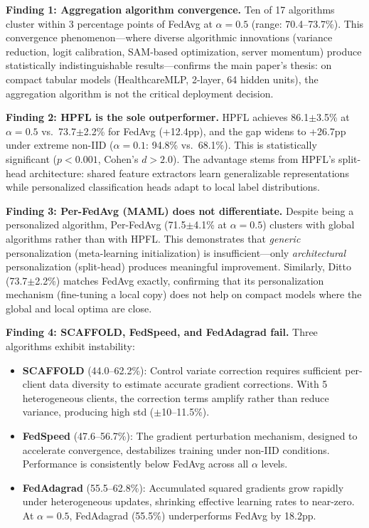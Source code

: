 \documentclass[conference,a4paper]{IEEEtran}
\begin{document}
\noindent\textbf{Finding 1: Aggregation algorithm convergence.} Ten of 17 algorithms cluster within 3 percentage points of FedAvg at $\alpha{=}0.5$ (range: 70.4--73.7\%). This convergence phenomenon---where diverse algorithmic innovations (variance reduction, logit calibration, SAM-based optimization, server momentum) produce statistically indistinguishable results---confirms the main paper's thesis: on compact tabular models (HealthcareMLP, 2-layer, 64 hidden units), the aggregation algorithm is not the critical deployment decision.

\noindent\textbf{Finding 2: HPFL is the sole outperformer.} HPFL achieves 86.1$\pm$3.5\% at $\alpha{=}0.5$ vs.\ 73.7$\pm$2.2\% for FedAvg (+12.4pp), and the gap widens to +26.7pp under extreme non-IID ($\alpha{=}0.1$: 94.8\% vs.\ 68.1\%). This is statistically significant ($p{<}0.001$, Cohen's $d{>}2.0$). The advantage stems from HPFL's split-head architecture: shared feature extractors learn generalizable representations while personalized classification heads adapt to local label distributions.

\noindent\textbf{Finding 3: Per-FedAvg (MAML) does not differentiate.} Despite being a personalized algorithm, Per-FedAvg (71.5$\pm$4.1\% at $\alpha{=}0.5$) clusters with global algorithms rather than with HPFL. This demonstrates that \textit{generic} personalization (meta-learning initialization) is insufficient---only \textit{architectural} personalization (split-head) produces meaningful improvement. Similarly, Ditto (73.7$\pm$2.2\%) matches FedAvg exactly, confirming that its personalization mechanism (fine-tuning a local copy) does not help on compact models where the global and local optima are close.

\noindent\textbf{Finding 4: SCAFFOLD, FedSpeed, and FedAdagrad fail.} Three algorithms exhibit instability:
\begin{itemize}
    \item \textbf{SCAFFOLD} (44.0--62.2\%): Control variate correction requires sufficient per-client data diversity to estimate accurate gradient corrections. With 5 heterogeneous clients, the correction terms amplify rather than reduce variance, producing high std ($\pm$10--11.5\%).
    \item \textbf{FedSpeed} (47.6--56.7\%): The gradient perturbation mechanism, designed to accelerate convergence, destabilizes training under non-IID conditions. Performance is consistently below FedAvg across all $\alpha$ levels.
    \item \textbf{FedAdagrad} (55.5--62.8\%): Accumulated squared gradients grow rapidly under heterogeneous updates, shrinking effective learning rates to near-zero. At $\alpha{=}0.5$, FedAdagrad (55.5\%) underperforms FedAvg by 18.2pp.
\end{itemize}
\end{document}
